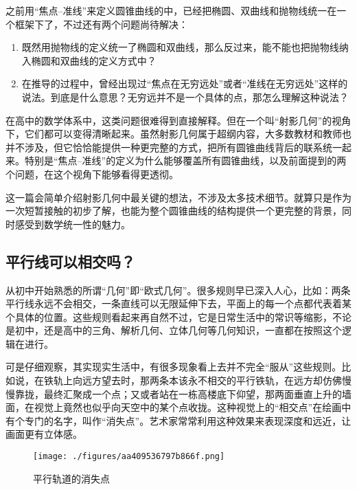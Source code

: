 
\begin{issues}
\issueDraft
\end{issues}


之前用“焦点–准线”来定义圆锥曲线的中，已经把椭圆、双曲线和抛物线统一在一个框架下了，不过还有两个问题尚待解决：
\begin{enumerate}
\item 既然用抛物线的定义统一了椭圆和双曲线，那么反过来，能不能也把抛物线纳入椭圆和双曲线的定义方式中？
\item 在推导的过程中，曾经出现过“焦点在无穷远处”或者“准线在无穷远处”这样的说法。到底是什么意思？无穷远并不是一个具体的点，那怎么理解这种说法？
\end{enumerate}

在高中的数学体系中，这类问题很难得到直接解释。但在一个叫“射影几何”的视角下，它们都可以变得清晰起来。虽然射影几何属于超纲内容，大多数教材和教师也并不涉及，但它恰恰能提供一种更完整的方式，把所有圆锥曲线背后的联系统一起来。特别是“焦点–准线”的定义为什么能够覆盖所有圆锥曲线，以及前面提到的两个问题，在这个视角下能够看得更透彻。

这一篇会简单介绍射影几何中最关键的想法，不涉及太多技术细节。就算只是作为一次短暂接触的初步了解，也能为整个圆锥曲线的结构提供一个更完整的背景，同时感受到数学统一性的魅力。

\subsection{平行线可以相交吗？}

从初中开始熟悉的所谓“几何”即“欧式几何”。很多规则早已深入人心，比如：两条平行线永远不会相交，一条直线可以无限延伸下去，平面上的每一个点都代表着某个具体的位置。这些规则看起来再自然不过，它是日常生活中的常识等缩影，不论是初中，还是高中的三角、解析几何、立体几何等几何知识，一直都在按照这个逻辑在进行。

可是仔细观察，其实现实生活中，有很多现象看上去并不完全“服从”这些规则。比如说，在铁轨上向远方望去时，那两条本该永不相交的平行铁轨，在远方却仿佛慢慢靠拢，最终汇聚成一个点；又或者站在一栋高楼底下仰望，那两面垂直上升的墙面，在视觉上竟然也似乎向天空中的某个点收拢。这种视觉上的“相交点”在绘画中有个专门的名字，叫作“消失点”。艺术家常常利用这种效果来表现深度和远近，让画面更有立体感。

\begin{figure}[ht]
\centering
\texttt{[image: ./figures/aa409536797b866f.png]}
\caption{平行轨道的消失点} \label{fig_HsCsFD_2}
\end{figure}

